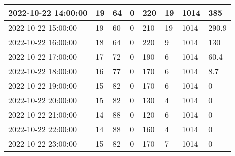 \begin{longtable}{|l|l|l|l|l|l|l|l|}
        2022-10-22 14:00:00 & 19 & 64 & 0 & 220 & 19 & 1014 & 385 \\ \hline
        2022-10-22 15:00:00 & 19 & 60 & 0 & 210 & 19 & 1014 & 290.9 \\ \hline
        2022-10-22 16:00:00 & 18 & 64 & 0 & 220 & 9 & 1014 & 130 \\ \hline
        2022-10-22 17:00:00 & 17 & 72 & 0 & 190 & 6 & 1014 & 60.4 \\ \hline
        2022-10-22 18:00:00 & 16 & 77 & 0 & 170 & 6 & 1014 & 8.7 \\ \hline
        2022-10-22 19:00:00 & 15 & 82 & 0 & 170 & 6 & 1014 & 0 \\ \hline
        2022-10-22 20:00:00 & 15 & 82 & 0 & 130 & 4 & 1014 & 0 \\ \hline
        2022-10-22 21:00:00 & 14 & 88 & 0 & 120 & 6 & 1014 & 0 \\ \hline
        2022-10-22 22:00:00 & 14 & 88 & 0 & 160 & 4 & 1014 & 0 \\ \hline
        2022-10-22 23:00:00 & 15 & 82 & 0 & 170 & 7 & 1014 & 0 \\ \hline
    \end{longtable}
